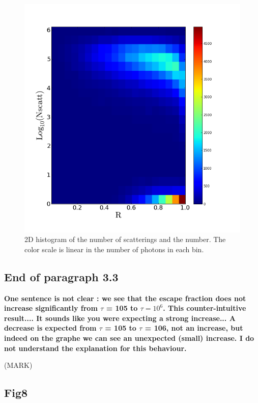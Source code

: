 \documentclass[12pt]{article}
\begin{document}
\begin{figure}
\begin{center}
  \includegraphics[scale=0.6]{Histogram2dNscattVSRadius.png}
\end{center}
\caption{\label{nscatt} 2D histogram of the number of scatterings and
  the number. The color scale is linear in the number of photons in
  each bin.}
\end{figure}


\subsection*{End of paragraph 3.3}

{\bf One sentence is not clear : we see that the escape fraction does
  not increase significantly from $\tau$ = 105 to $\tau =
  10^{6}$. This counter-intuitive result.... It sounds like you were
  expecting a strong increase... A decrease is expected from $\tau$ =
  105 to $\tau$ = 106, not an increase, but indeed on the graphe we
  can see an unexpected (small) increase. I do not understand the
  explanation for this behaviour.} 


(MARK)

\subsection*{Fig8}
\end{document}
